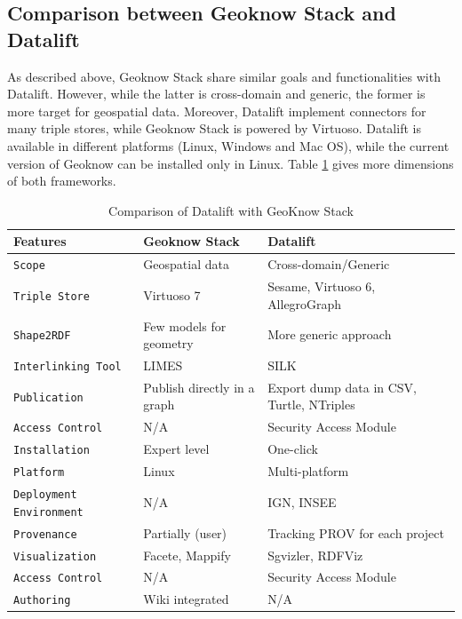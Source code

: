 \subsection{Comparison between Geoknow Stack and Datalift}
\label{sec:geoknow-datalift}
As described above, Geoknow Stack share similar goals and functionalities with Datalift. However, while the latter is cross-domain and generic, the former is more target for geospatial data. Moreover, Datalift implement connectors for many triple stores, while Geoknow Stack is powered by Virtuoso. Datalift is available in different platforms (Linux, Windows and Mac OS), while the current version of Geoknow can be installed only in Linux. Table \ref{tab:geoknow-datalift} gives more dimensions of both frameworks. 

\begin{table}[ht!bp]
    \caption{Comparison of Datalift with GeoKnow Stack} \label{tab:geoknow-datalift}
    \small
    \center
    \begin{tabularx}{\textwidth}{@{}llX@{}}
    \toprule
    \textbf{Features} 		& \textbf{Geoknow Stack } &  \textbf{Datalift} \\
    \toprule
    \texttt{Scope} 	& Geospatial data & Cross-domain/Generic\\
    \midrule
    \texttt{Triple Store} & Virtuoso 7 & Sesame, Virtuoso 6, AllegroGraph\\
    \midrule
    \texttt{Shape2RDF} &  Few models for geometry & More generic approach\\ 
    \midrule
    \texttt{Interlinking Tool} & LIMES & SILK \\
    \midrule
    \texttt{Publication} & Publish directly in a graph & Export dump data in CSV, Turtle, NTriples\\
    \midrule
    \texttt{Access Control} & N/A & Security Access Module\\
    \midrule
    \texttt{Installation} & Expert level & One-click\\
    \midrule
    \texttt{Platform} & Linux & Multi-platform\\
    \midrule
    \texttt{Deployment Environment} & N/A & IGN, INSEE\\
    \midrule
    \texttt{Provenance} & Partially (user) & Tracking PROV for each project\\
    \midrule
    \texttt{Visualization} & Facete, Mappify  & Sgvizler, RDFViz\\
    \midrule
    \texttt{Access Control} & N/A & Security Access Module\\
    \midrule
    \texttt{Authoring} & Wiki integrated & N/A\\
    \bottomrule
  
    \end{tabularx}
    \end{table}
 

